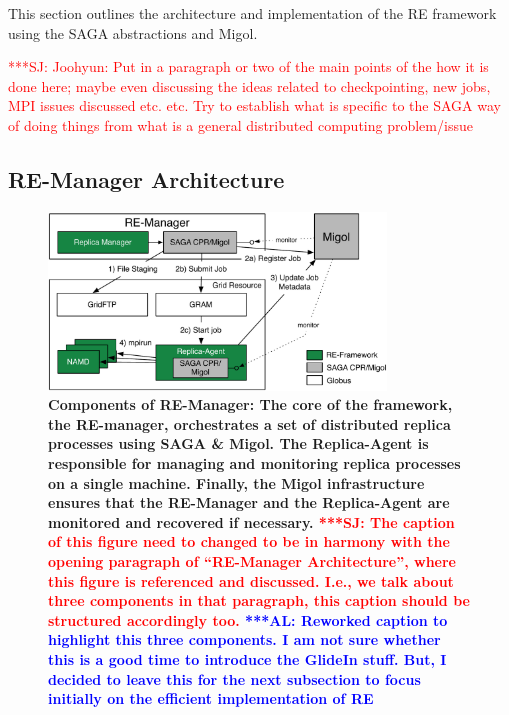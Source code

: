 \documentclass{rspublic}
\newcommand{\alnote}[1]{ {\textcolor{blue} { ***AL: #1 }}}
\newcommand{\jhanote}[1]{ {\textcolor{red} { ***SJ: #1 }}}
\newcommand{\alnote}[1]{}
\newcommand{\jhanote}[1]{}
\begin{document}
This section outlines the architecture and implementation of the RE framework
using the SAGA abstractions and Migol.

\jhanote{Joohyun: Put in a paragraph or two of the main points of the
  how it is done here; maybe even discussing the ideas related to
  checkpointing, new jobs, MPI issues discussed etc. etc. Try to
  establish what is specific to the SAGA way of doing things from what
  is a general distributed computing problem/issue}
          
\subsection{RE-Manager Architecture}

\begin{figure}[t]
      \centering
          \includegraphics[width=0.8\textwidth]{REMDgManager-architecture.pdf}
          \caption{\footnotesize \bf Components of RE-Manager: The
            core of the framework, the RE-manager, orchestrates 
            a set of distributed replica processes using SAGA \& Migol. 
            The Replica-Agent is responsible for managing and monitoring 
            replica processes on a single machine. Finally, the Migol 
            infrastructure ensures that the RE-Manager and the Replica-Agent 
            are monitored and recovered if necessary.            
            \jhanote{The caption of this
              figure need to changed to be in harmony with the opening
              paragraph of ``RE-Manager Architecture'', where this
              figure is referenced and discussed. I.e., we talk about
              three components in that paragraph, this caption should
              be structured accordingly too.}
              \alnote{Reworked caption to highlight this three components. 
              I am not sure whether this is a good time to introduce the GlideIn stuff. But, I 
              decided to leave this for the next subsection to focus initially on
              the efficient implementation of RE}
              }
      \label{fig:REMD-Manager-architecture}
\end{figure}
\end{document}
